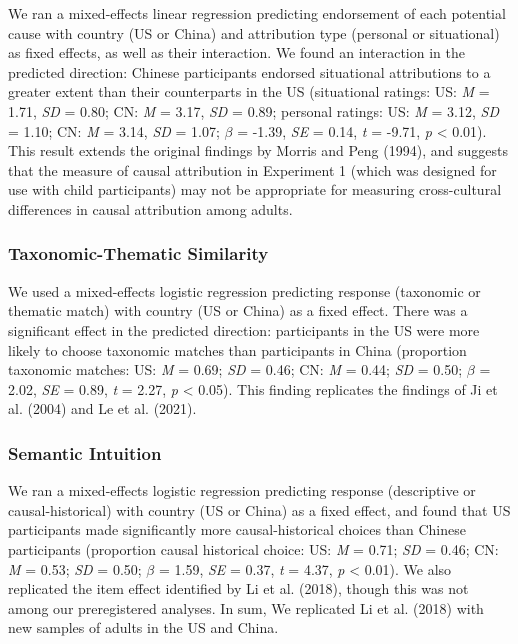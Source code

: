 \documentclass[
  man,floatsintext]{apa6}
\begin{document}
We ran a mixed-effects linear regression predicting endorsement of each potential cause with country (US or China) and attribution type (personal or situational) as fixed effects, as well as their interaction. We found an interaction in the predicted direction: Chinese participants endorsed situational attributions to a greater extent than their counterparts in the US (situational ratings: US: \emph{M} = 1.71, \emph{SD} = 0.80; CN: \emph{M} = 3.17, \emph{SD} = 0.89; personal ratings: US: \emph{M} = 3.12, \emph{SD} = 1.10; CN: \emph{M} = 3.14, \emph{SD} = 1.07; \(\beta\) = -1.39, \emph{SE} = 0.14, \emph{t} = -9.71, \emph{p} \textless{} 0.01). This result extends the original findings by Morris and Peng (1994), and suggests that the measure of causal attribution in Experiment 1 (which was designed for use with child participants) may not be appropriate for measuring cross-cultural differences in causal attribution among adults.

\hypertarget{taxonomic-thematic-similarity-1}{%
\subsubsection{Taxonomic-Thematic Similarity}\label{taxonomic-thematic-similarity-1}}

We used a mixed-effects logistic regression predicting response (taxonomic or thematic match) with country (US or China) as a fixed effect. There was a significant effect in the predicted direction: participants in the US were more likely to choose taxonomic matches than participants in China (proportion taxonomic matches: US: \emph{M} = 0.69; \emph{SD} = 0.46; CN: \emph{M} = 0.44; \emph{SD} = 0.50; \(\beta\) = 2.02, \emph{SE} = 0.89, \emph{t} = 2.27, \emph{p} \textless{} 0.05). This finding replicates the findings of Ji et al. (2004) and Le et al. (2021).

\hypertarget{semantic-intuition-1}{%
\subsubsection{Semantic Intuition}\label{semantic-intuition-1}}

We ran a mixed-effects logistic regression predicting response (descriptive or causal-historical) with country (US or China) as a fixed effect, and found that US participants made significantly more causal-historical choices than Chinese participants (proportion causal historical choice: US: \emph{M} = 0.71; \emph{SD} = 0.46; CN: \emph{M} = 0.53; \emph{SD} = 0.50; \(\beta\) = 1.59, \emph{SE} = 0.37, \emph{t} = 4.37, \emph{p} \textless{} 0.01). We also replicated the item effect identified by Li et al. (2018), though this was not among our preregistered analyses. In sum, We replicated Li et al. (2018) with new samples of adults in the US and China.
\end{document}
